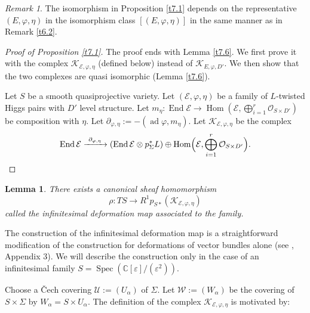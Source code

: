 \documentclass[12pt,a4paper,oneside,english]{smfart}
\newtheorem{lem}[thm]{Lemma}
\theoremstyle{definition}
\theoremstyle{remark}
\newtheorem{rem}[thm]{Remark}
\DeclareMathOperator{\End}{End}
\DeclareMathOperator{\Hom}{Hom}
\DeclareMathOperator{\ad}{ad}
\DeclareMathOperator{\Spec}{Spec}
\newcommand{\cO}{\mathcal{O}}
\newcommand{\cE}{\mathcal{E}}
\newcommand{\KK}{\mathscr{K}}
\begin{document}
\begin{rem}\label{t7.2}
The isomorphism in Proposition \ref{t7.1} depends on the representative $(E, \varphi, \eta)$ in the isomorphism class $[(E, \varphi, \eta)]$ in the same manner as in Remark \ref{t6.2}.
\end{rem}

\begin{proof}[Proof of Proposition \ref{t7.1}]
The proof ends with Lemma \ref{t7.6}. We first prove it with the complex $\KK_{\cE, \varphi, \eta}$ (defined below) instead of $\KK_{E, \varphi, D'}$. We then show that the two complexes are quasi isomorphic (Lemma \ref{t7.6}).

Let $S$ be a smooth quasiprojective variety. Let $(\cE, \varphi, \eta)$ be a family of $L$-twisted Higgs pairs with $D'$ level structure. Let $m_\eta \colon \End \cE \to \Hom(\cE, \bigoplus_{i=1}^{r} \cO_{S \times D'})$ be composition with $\eta$. Let $\partial_{\varphi, \eta} := -(\ad \varphi, m_\eta)$. Let $\KK_{\cE, \varphi, \eta}$ be the complex
\[
\End \cE \xrightarrow{\ \partial_{\varphi, \eta}\ } (\End \cE \otimes p_\Sigma^* L) \oplus \Hom\Bigl(\cE, \bigoplus_{i=1}^{r} \cO_{S \times D'}\Bigr).
\]
\end{proof}

\begin{lem}\label{t7.3}
There exists a canonical sheaf homomorphism
\[
\rho \colon TS \to R^1 p_{S*}(\KK_{\cE, \varphi, \eta})
\]
called the infinitesimal deformation map associated to the family.
\end{lem}

The construction of the infinitesimal deformation map is a straightforward modification of the construction for deformations of vector bundles alone (see \cite{Se}, Appendix 3). We will describe the construction only in the case of an infinitesimal family $S = \Spec(\mathbb{C}[\varepsilon]/(\varepsilon^2))$.

Choose a \v{C}ech covering $\mathcal{U} := (U_\alpha)$ of $\Sigma$. Let $\mathcal{W} := (W_\alpha)$ be the covering of $S \times \Sigma$ by $W_\alpha = S \times U_\alpha$. The definition of the complex $\KK_{\cE, \varphi, \eta}$ is motivated by:
\end{document}
